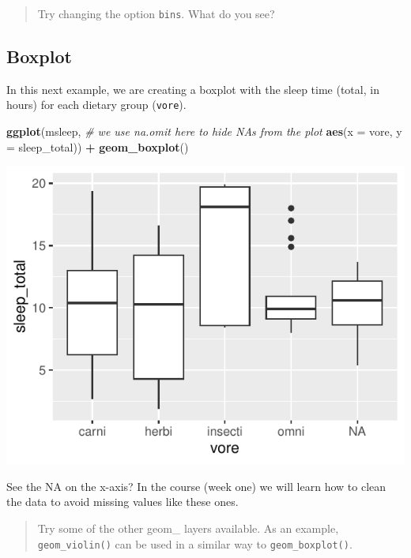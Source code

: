 \documentclass[
]{book}
\newenvironment{Shaded}{\begin{snugshade}}{\end{snugshade}}
\newcommand{\AttributeTok}[1]{\textcolor[rgb]{0.13,0.29,0.53}{#1}}
\newcommand{\CommentTok}[1]{\textcolor[rgb]{0.56,0.35,0.01}{\textit{#1}}}
\newcommand{\FunctionTok}[1]{\textcolor[rgb]{0.13,0.29,0.53}{\textbf{#1}}}
\newcommand{\NormalTok}[1]{#1}
\newcommand{\SpecialCharTok}[1]{\textcolor[rgb]{0.81,0.36,0.00}{\textbf{#1}}}
\begin{document}
\begin{quote}
Try changing the option \texttt{bins}.
What do you see?
\end{quote}

\hypertarget{boxplot}{%
\subsection*{Boxplot}\label{boxplot}}

In this next example, we are creating a boxplot with the sleep time (total, in hours) for each dietary group (\texttt{vore}).

\begin{Shaded}
\begin{Highlighting}[]
\FunctionTok{ggplot}\NormalTok{(msleep, }\CommentTok{\# we use na.omit here to hide NAs from the plot}
       \FunctionTok{aes}\NormalTok{(}\AttributeTok{x =}\NormalTok{ vore,}
           \AttributeTok{y =}\NormalTok{ sleep\_total)) }\SpecialCharTok{+}
  \FunctionTok{geom\_boxplot}\NormalTok{()}
\end{Highlighting}
\end{Shaded}

\includegraphics{_main_files/figure-latex/unnamed-chunk-23-1.pdf}

See the NA on the x-axis?
In the course (week one) we will learn how to clean the data to avoid missing values like these ones.

\begin{quote}
Try some of the other geom\_ layers available.
As an example, \texttt{geom\_violin()} can be used in a similar way to \texttt{geom\_boxplot()}.
\end{quote}
\end{document}
